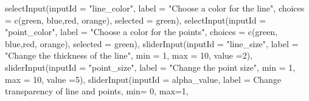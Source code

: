 \documentclass[
]{book}
\newenvironment{Shaded}{\begin{snugshade}}{\end{snugshade}}
\newcommand{\AttributeTok}[1]{\textcolor[rgb]{0.77,0.63,0.00}{#1}}
\newcommand{\DecValTok}[1]{\textcolor[rgb]{0.00,0.00,0.81}{#1}}
\newcommand{\FunctionTok}[1]{\textcolor[rgb]{0.00,0.00,0.00}{#1}}
\newcommand{\NormalTok}[1]{#1}
\newcommand{\StringTok}[1]{\textcolor[rgb]{0.31,0.60,0.02}{#1}}
\begin{document}
\begin{Shaded}
\begin{Highlighting}[]
            \FunctionTok{selectInput}\NormalTok{(}\AttributeTok{inputId =} \StringTok{"line\_color"}\NormalTok{,}
                        \AttributeTok{label =} \StringTok{"Choose a color for the line"}\NormalTok{,}
                        \AttributeTok{choices =} \FunctionTok{c}\NormalTok{(}\StringTok{\textquotesingle{}green\textquotesingle{}}\NormalTok{, }\StringTok{\textquotesingle{}blue\textquotesingle{}}\NormalTok{,}\StringTok{\textquotesingle{}red\textquotesingle{}}\NormalTok{, }\StringTok{\textquotesingle{}orange\textquotesingle{}}\NormalTok{),}
                        \AttributeTok{selected =} \StringTok{\textquotesingle{}green\textquotesingle{}}\NormalTok{),}
            \FunctionTok{selectInput}\NormalTok{(}\AttributeTok{inputId =} \StringTok{"point\_color"}\NormalTok{,}
                        \AttributeTok{label =} \StringTok{"Choose a color for the points"}\NormalTok{,}
                        \AttributeTok{choices =} \FunctionTok{c}\NormalTok{(}\StringTok{\textquotesingle{}green\textquotesingle{}}\NormalTok{, }\StringTok{\textquotesingle{}blue\textquotesingle{}}\NormalTok{,}\StringTok{\textquotesingle{}red\textquotesingle{}}\NormalTok{, }\StringTok{\textquotesingle{}orange\textquotesingle{}}\NormalTok{),}
                        \AttributeTok{selected =} \StringTok{\textquotesingle{}green\textquotesingle{}}\NormalTok{),}
            \FunctionTok{sliderInput}\NormalTok{(}\AttributeTok{inputId =} \StringTok{"line\_size"}\NormalTok{,}
                        \AttributeTok{label =} \StringTok{"Change the thickness of the line"}\NormalTok{,}
                        \AttributeTok{min =} \DecValTok{1}\NormalTok{,}
                        \AttributeTok{max =} \DecValTok{10}\NormalTok{,}
                        \AttributeTok{value =}\DecValTok{2}\NormalTok{),}
            \FunctionTok{sliderInput}\NormalTok{(}\AttributeTok{inputId =} \StringTok{"point\_size"}\NormalTok{,}
                        \AttributeTok{label =} \StringTok{"Change the point size"}\NormalTok{,}
                        \AttributeTok{min =} \DecValTok{1}\NormalTok{,}
                        \AttributeTok{max =} \DecValTok{10}\NormalTok{,}
                        \AttributeTok{value =}\DecValTok{5}\NormalTok{),}
            \FunctionTok{sliderInput}\NormalTok{(}\AttributeTok{inputId =} \StringTok{\textquotesingle{}alpha\_value\textquotesingle{}}\NormalTok{,}
                        \AttributeTok{label =} \StringTok{\textquotesingle{}Change transparency of line and points\textquotesingle{}}\NormalTok{,}
                        \AttributeTok{min=} \DecValTok{0}\NormalTok{,}
                        \AttributeTok{max=}\DecValTok{1}\NormalTok{,}

\end{Highlighting}
\end{Shaded}
\end{document}
